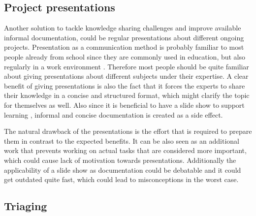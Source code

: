\subsection{Project presentations}
\label{section:presentations-theory}

Another solution to tackle knowledge sharing challenges and improve available informal documentation, could be regular presentations about different ongoing projects. Presentation as
a communication method is probably familiar to most people already from school since they are commonly used in education, but also regularly in a work environment \citep{Bhattacharyya2011}.
Therefore most people should be quite familiar about giving presentations about different subjects under their expertise. A clear benefit of giving presentations is also the fact
that it forces the experts to share their knowledge in a concise and structured format, which might clarify the topic for themselves as well. Also since it is beneficial to have
a slide show to support learning \citep{Wecker2012}, informal and concise documentation is created as a side effect.

The natural drawback of the presentations is the effort that is required to prepare them in contrast to the expected benefits. It can be also seen as an additional work that prevents
working on actual tasks that are considered more important, which could cause lack of motivation towards presentations. Additionally the applicability of a slide show as documentation could
be debatable and it could get outdated quite fast, which could lead to misconceptions in the worst case.

\subsection{Triaging}
\label{section:triage-theory}

